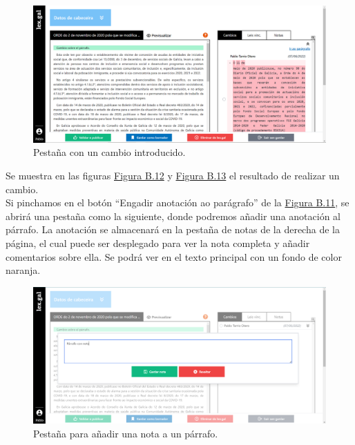 \begin{figure}[H]
\centerline{\includegraphics[width=15cm]{figuras/manualUsuario/PestanaCambios.PNG}}
\caption{Pestaña con un cambio introducido.}
\label{enlacePestanaCambios}
\end{figure}

Se muestra en las figuras \hyperref[enlaceCambios]{Figura B.12} y \hyperref[enlacePestanaCambios]{Figura B.13} el resultado de realizar un cambio.
\\

Si pinchamos en el botón ``Engadir anotación ao parágrafo'' de la \hyperref[enlaceContextMenuLexGal]{Figura B.11}, se abrirá una pestaña como la siguiente, donde podremos añadir una anotación al párrafo. La anotación se almacenará en la pestaña de notas de la derecha de la página, el cual puede ser desplegado para ver la nota completa y añadir comentarios sobre ella. Se podrá ver en el texto principal con un fondo de color naranja.

\begin{figure}[H]
\centerline{\includegraphics[width=15cm]{figuras/manualUsuario/Notas.PNG}}
\caption{Pestaña para añadir una nota a un párrafo.}
\label{enlaceNotas}
\end{figure}

